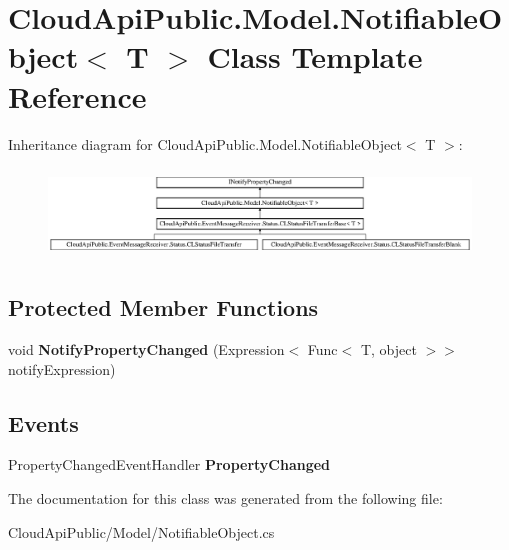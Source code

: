 \hypertarget{class_cloud_api_public_1_1_model_1_1_notifiable_object_3_01_t_01_4}{\section{Cloud\-Api\-Public.\-Model.\-Notifiable\-Object$<$ T $>$ Class Template Reference}
\label{class_cloud_api_public_1_1_model_1_1_notifiable_object_3_01_t_01_4}
}
Inheritance diagram for Cloud\-Api\-Public.\-Model.\-Notifiable\-Object$<$ T $>$\-:\begin{figure}[H]
\begin{center}
\leavevmode
\includegraphics[height=2.408602cm]{class_cloud_api_public_1_1_model_1_1_notifiable_object_3_01_t_01_4}
\end{center}
\end{figure}
\subsection*{Protected Member Functions}
\begin{DoxyCompactItemize}
\item 
\hypertarget{class_cloud_api_public_1_1_model_1_1_notifiable_object_3_01_t_01_4_ada00cf7e1ad3a9d8dd44ec1f6ee5a63f}{void {\bfseries Notify\-Property\-Changed} (Expression$<$ Func$<$ T, object $>$$>$ notify\-Expression)}\label{class_cloud_api_public_1_1_model_1_1_notifiable_object_3_01_t_01_4_ada00cf7e1ad3a9d8dd44ec1f6ee5a63f}

\end{DoxyCompactItemize}
\subsection*{Events}
\begin{DoxyCompactItemize}
\item 
\hypertarget{class_cloud_api_public_1_1_model_1_1_notifiable_object_3_01_t_01_4_a8c2b3decf29a8ef10820752a94504bce}{Property\-Changed\-Event\-Handler {\bfseries Property\-Changed}}\label{class_cloud_api_public_1_1_model_1_1_notifiable_object_3_01_t_01_4_a8c2b3decf29a8ef10820752a94504bce}

\end{DoxyCompactItemize}


The documentation for this class was generated from the following file\-:\begin{DoxyCompactItemize}
\item 
Cloud\-Api\-Public/\-Model/Notifiable\-Object.\-cs\end{DoxyCompactItemize}

